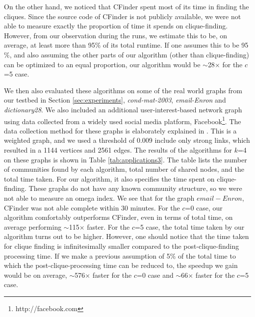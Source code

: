 On the other hand, we noticed that CFinder spent most of its time in finding the cliques. Since the source code of CFinder is not publicly available, we were not able to measure exactly the proportion of time it spends on clique-finding. However, from our observation during the runs, we estimate this to be, on average, at least more than 95$\%$ of its total runtime. If one assumes this to be 95$\%$, and also assuming the other parts of our algorithm (other than clique-finding) can be optimized to an equal proportion, our algorithm would be $\sim$28$\times$ for the $c$=5 case. 


We then also evaluated these algorithms on some of the real world graphs from our testbed in Section \ref{sec:experiments}, {\em cond-mat-2003}, {\em email-Enron} and {\em dictionary28}. We also included an additional user-interest-based network graph using data collected from a widely used social media platform, Facebook\footnote{http://facebook.com}. The data collection method for these graphs is elaborately explained in \cite{dianapaper}. This is a weighted graph, and we used a threshold of 0.009 include only strong links, which resulted in a 1144 vertices and 2561 edges. 
The results of the algorithms for $k$=4 on these graphs is shown in Table \ref{tab:applications3}. The table lists the number of communities found by each algorithm, total number of shared nodes, and the total time taken. For our algorithm, it also specifies the time spent on clique-finding. These graphs do not have any known community structure, so we were not able to measure an omega index. We see that for the graph $email-Enron$, CFinder was not able complete within 30 minutes. For the $c$=0 case, our algorithm comfortably outperforms CFinder, even in terms of total time, on average performing $\sim$115$\times$ faster. For the $c$=5 case, the total time taken by our algorithm turns out to be higher. However, one should notice that the time taken for clique finding is infinitesimally smaller compared to the post-clique-finding processing time. If we make a previous assumption of 5$\%$ of the total time to which the post-clique-processing time can be reduced to, the speedup we gain would be on average, $\sim$576$\times$ faster for the $c$=0 case and $\sim$66$\times$ faster for the $c$=5 case.












